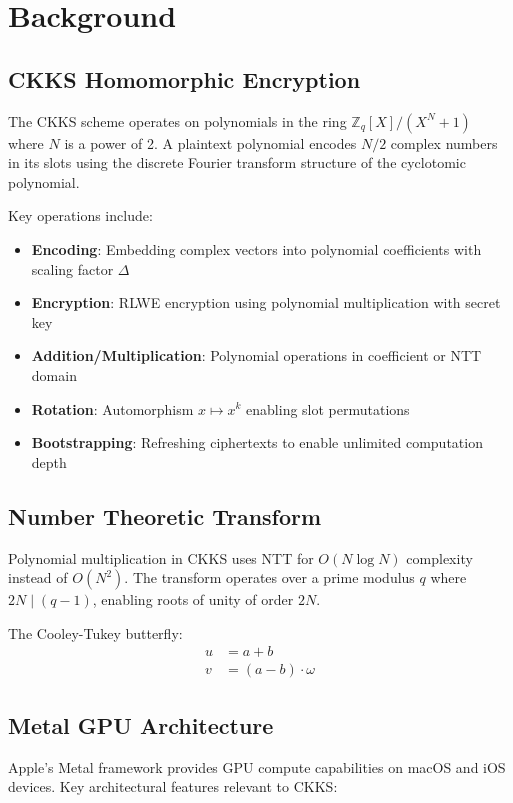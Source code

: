 \documentclass[11pt,oneside]{article}
\begin{document}
\section{Background}

\subsection{CKKS Homomorphic Encryption}

The CKKS scheme operates on polynomials in the ring $\mathbb{Z}_q[X]/(X^N + 1)$ where $N$ is a power of 2. A plaintext polynomial encodes $N/2$ complex numbers in its slots using the discrete Fourier transform structure of the cyclotomic polynomial.

Key operations include:
\begin{itemize}
    \item \textbf{Encoding}: Embedding complex vectors into polynomial coefficients with scaling factor $\Delta$
    \item \textbf{Encryption}: RLWE encryption using polynomial multiplication with secret key
    \item \textbf{Addition/Multiplication}: Polynomial operations in coefficient or NTT domain
    \item \textbf{Rotation}: Automorphism $x \mapsto x^k$ enabling slot permutations
    \item \textbf{Bootstrapping}: Refreshing ciphertexts to enable unlimited computation depth
\end{itemize}

\subsection{Number Theoretic Transform}

Polynomial multiplication in CKKS uses NTT for $O(N \log N)$ complexity instead of $O(N^2)$. The transform operates over a prime modulus $q$ where $2N \mid (q-1)$, enabling roots of unity of order $2N$.

The Cooley-Tukey butterfly:
\begin{align}
u &= a + b \\
v &= (a - b) \cdot \omega
\end{align}

\subsection{Metal GPU Architecture}

Apple's Metal framework provides GPU compute capabilities on macOS and iOS devices. Key architectural features relevant to CKKS:
\end{document}
